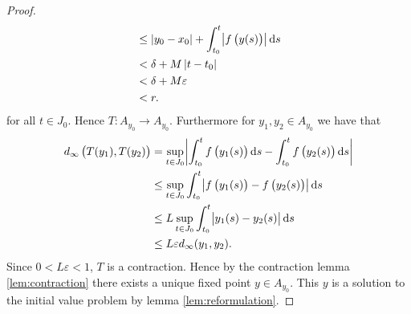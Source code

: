 \begin{proof}
\begin{align*}
&\leq \abs[0]{y_0 - x_0} + \int_{t_0}^t \abs[1]{f\del[1]{y(s)}}\d s\\
&< \delta + M\abs[0]{t - t_0}\\
&< \delta + M\varepsilon\\
&< r.
\end{align*}
\noindent for all $t \in J_0$. Hence $T : A_{y_0} \to A_{y_0}$. Furthermore for $y_1,y_2 \in A_{y_0}$ we have that 
\begin{align*}
d_\infty\del[1]{T(y_1),T(y_2)} &= \sup_{t \in J_0} \abs[3]{\int_{t_0}^t f\del[1]{y_1(s)}\d s - \int_{t_0}^ tf\del[1]{y_2(s)}\d s}\\
&\leq \sup_{t \in J_0} \int_{t_0}^t \abs[1]{f\del[1]{y_1(s)} - f\del[1]{y_2(s)}}\d s\\
&\leq L\sup_{t \in J_0}\int_{t_0}^t\abs[1]{y_1(s) - y_2(s)}\d s\\
&\leq L\varepsilon d_\infty(y_1,y_2).
\end{align*}
Since $0 < L\varepsilon < 1$, $T$ is a contraction. Hence by the contraction lemma \ref{lem:contraction} there exists a unique fixed point $y \in A_{y_0}$. This $y$ is a solution to the initial value problem by lemma \ref{lem:reformulation}.
\end{proof}